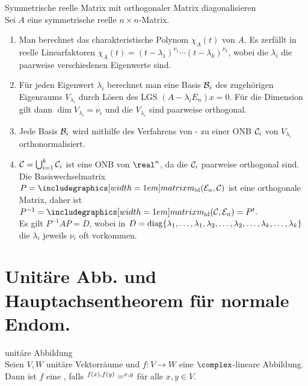 \begin{Prozedur}%
{Symmetrische reelle Matrix mit orthogonaler Matrix diagonalisieren} \\
    Sei $A$ eine symmetrische reelle $n \times n$-Matrix.
    \begin{enumerate}
        \item Man berechnet das charakteristische Polynom $\chi_A(t)$ von $A$.
        Es zerfällt in reelle Linearfaktoren
        $\chi_A(t) = (t - \lambda_1)^{\nu_1} \cdots (t - \lambda_k)^{\nu_k}$,
        wobei die $\lambda_i$ die paarweise verschiedenen Eigenwerte sind.

        \item Für jeden Eigenwert $\lambda_i$ berechnet man eine Basis
        $\mathcal{B}_i$ des zugehörigen Eigenraums $V_{\lambda_i}$ durch Lösen
        des LGS $(A - \lambda_i E_n)x = 0$.
        Für die Dimension gilt dann $\dim V_{\lambda_i} = \nu_i$ und die
        $V_{\lambda_i}$ sind paarweise orthogonal.

        \item Jede Basis $\mathcal{B}_i$ wird mithilfe des Verfahrens
        von - zu einer ONB $\mathcal{C}_i$ von
        $V_{\lambda_i}$ orthonormalisiert.

        \item $\mathcal{C} = \bigcup_{i=1}^k \mathcal{C}_i$ ist eine ONB von
        $\real^n$, da die $\mathcal{C}_i$ paarweise orthogonal sind.
        Die Basiswechselmatrix $P = \matrixm_{\id}(\basis{E}_n, \basis{C})$
        ist eine orthogonale Matrix, daher ist
        $P^{-1} = \matrixm_{\id}(\basis{C}, \basis{E}_n) = P^t$. \\
        Es gilt $P^{-1} A P = D$, wobei in
        $D = \operatorname{diag}\{\lambda_1, \ldots, \lambda_1, \lambda_2, \ldots,
        \lambda_2, \ldots, \lambda_k, \ldots, \lambda_k\}$ die $\lambda_i$
        jeweils $\nu_i$ oft vorkommen.
    \end{enumerate}
\end{Prozedur}

\section{%
    Unitäre Abb. und Hauptachsentheorem für normale Endom.%
}

\begin{Def}{unitäre Abbildung} \\
    Seien $V, W$ unitäre Vektorräume und $f: V \rightarrow W$ eine
    $\complex$-lineare Abbildung. \\
    Dann ist $f$ eine , falls
    $\sp{f(x), f(y)} = \sp{x, y}$ für alle $x, y \in V$.
\end{Def}

